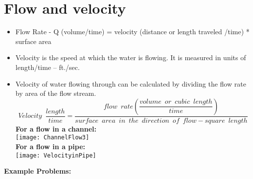 %
%

\section{Flow and velocity}
\begin{itemize}
\item Flow Rate - Q (volume/time) = velocity (distance or length traveled /time) * surface area
\item Velocity is the speed at which the water is flowing.  It is measured in units of length/time – ft./sec.
\item Velocity of water flowing through can be calculated by dividing the flow rate by area of the flow stream.\\
\vspace{0.5cm}
$$Velocity \enspace \dfrac{length}{time}= \dfrac{flow \enspace rate(\dfrac{volume \enspace or \enspace cubic \enspace length}{time})}{surface \enspace area \enspace in \enspace the \enspace direction \enspace of \enspace flow-square \enspace length}$$
\vspace{0.5cm}
\textbf{For a flow in a channel:}\\
\vspace{0.5cm}
\texttt{[image: ChannelFlow3]}\\

\textbf{For a flow in a pipe:}\\
\vspace{0.5cm}
\texttt{[image: VelocityinPipe]}\\
\vspace{0.5cm}
\end{itemize}
\textbf{Example Problems:}\\

